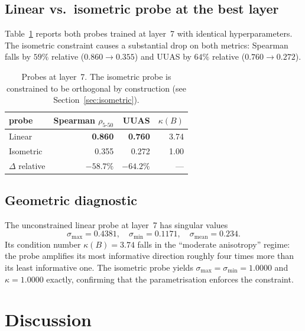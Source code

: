 \documentclass[11pt,a4paper]{article}
\newcommand{\layerbest}{7\xspace}
\begin{document}
\subsection{Linear vs.\ isometric probe at the best layer}

Table~\ref{tab:liniso} reports both probes trained at layer~\layerbest
with identical hyperparameters. The isometric constraint causes a
substantial drop on both metrics: Spearman falls by $59\%$ relative
($0.860 \to 0.355$) and UUAS by $64\%$ relative ($0.760 \to 0.272$).

\begin{table}[t]
\centering
\small
\begin{tabular}{lrrr}
\toprule
probe & Spearman $\rho_{5\text{-}50}$ & UUAS & $\kappa(B)$ \\
\midrule
Linear   & \textbf{0.860} & \textbf{0.760} & 3.74 \\
Isometric & 0.355 & 0.272 & 1.00 \\
\midrule
$\Delta$ relative & $-58.7\%$ & $-64.2\%$ & --- \\
\bottomrule
\end{tabular}
\caption{Probes at layer~\layerbest. The isometric probe is
constrained to be orthogonal by construction
(see Section~\ref{sec:isometric}).}
\label{tab:liniso}
\end{table}

\subsection{Geometric diagnostic}

The unconstrained linear probe at layer~\layerbest has singular
values
\begin{equation*}
  \sigma_{\max} = 0.4381, \quad \sigma_{\min} = 0.1171,
  \quad \sigma_{\text{mean}} = 0.234.
\end{equation*}
Its condition number $\kappa(B) = 3.74$ falls in the
``moderate anisotropy'' regime: the probe amplifies its most
informative direction roughly four times more than its least
informative one. The isometric probe yields
$\sigma_{\max} = \sigma_{\min} = 1.0000$ and $\kappa = 1.0000$
exactly, confirming that the parametrisation enforces the constraint.

\section{Discussion}
\label{sec:discussion}
\end{document}
